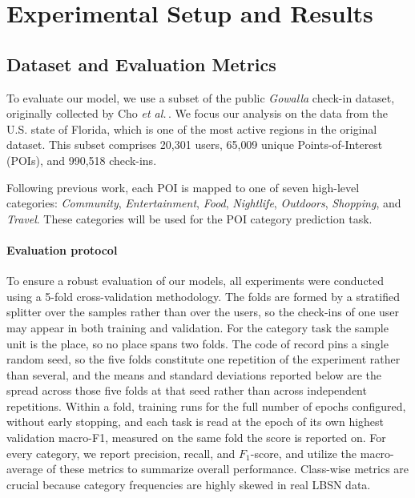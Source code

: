 \section{Experimental Setup and Results}
\label{sec:cbic:experiments}

\subsection{Dataset and Evaluation Metrics}
\label{sec:cbic:dataset}

To evaluate our model, we use a subset of the public \emph{Gowalla} check-in dataset, originally collected by Cho \textit{et al.}\,\cite{cho2011gowalla}. We focus our analysis on the data from the U.S. state of Florida, which is one of the most active regions in the original dataset. This subset comprises 20{,}301 users, 65{,}009 unique Points-of-Interest (POIs), and 990{,}518 check-ins.

Following previous work, each POI is mapped to one of seven high-level categories: \emph{Community}, \emph{Entertainment}, \emph{Food}, \emph{Nightlife}, \emph{Outdoors}, \emph{Shopping}, and \emph{Travel}. These categories will be used for the POI category prediction task.

\paragraph*{Evaluation protocol}
To ensure a robust evaluation of our models, all experiments were conducted using a 5-fold cross-validation methodology.
The folds are formed by a stratified splitter over the samples rather than over the users, so the check-ins of one user may appear in both training and validation. For the category task the sample unit is the place, so no place spans two folds. The code of record pins a single random seed, so the five folds constitute one repetition of the experiment rather than several, and the means and standard deviations reported below are the spread across those five folds at that seed rather than across independent repetitions. Within a fold, training runs for the full number of epochs configured, without early stopping, and each task is read at the epoch of its own highest validation macro-F1, measured on the same fold the score is reported on. For every category, we report precision, recall, and $F_{1}$-score, and utilize the macro-average of these metrics to summarize overall performance. Class-wise metrics are crucial because category frequencies are highly skewed in real LBSN data.

